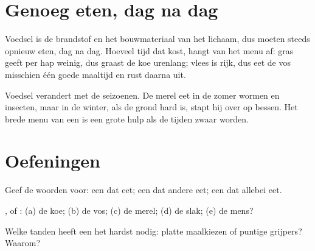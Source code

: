 \section{Genoeg eten, dag na dag}

\begin{proposition}\label{prop:g2:what-animals-eat:daily}
Voedsel is de brandstof en het bouwmateriaal van het lichaam, dus
 moeten steeds opnieuw eten, dag na dag. Hoeveel tijd dat kost,
hangt van het menu af: gras geeft per hap weinig, dus graast de koe
urenlang; vlees is rijk, dus eet de vos misschien één goede maaltijd en
rust daarna uit.
\end{proposition}
\admitted

\begin{example}\label{ex:g2:what-animals-eat:winter}
Voedsel verandert met de seizoenen. De merel eet in de zomer wormen en
insecten, maar in de winter, als de grond hard is, stapt hij over op
bessen. Het brede menu van een  is een grote hulp als de
tijden zwaar worden.
\end{example}

\section{Oefeningen}

\begin{exercise}[$\star$]\label{exo:g2:what-animals-eat:1}
Geef de woorden voor: een  dat  eet; een  dat andere
 eet; een  dat allebei eet.
\end{exercise}

\begin{exercise}[$\star$]\label{exo:g2:what-animals-eat:2}
,  of : (a) de koe; (b) de vos; (c) de
merel; (d) de slak; (e) de mens?
\end{exercise}

\begin{exercise}[$\star$]\label{exo:g2:what-animals-eat:3}
Welke tanden heeft een  het hardst nodig: platte maalkiezen
of puntige grijpers? Waarom?
\end{exercise}

